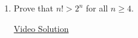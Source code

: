 \begin{enumerate}

\end{enumerate}



\begin{enumerate}
	\item Prove that $n!>2^n$ for all $n \ge 4$.

	\href{https://youtu.be/xt3AgzI59LU}{Video Solution}


\end{enumerate}

